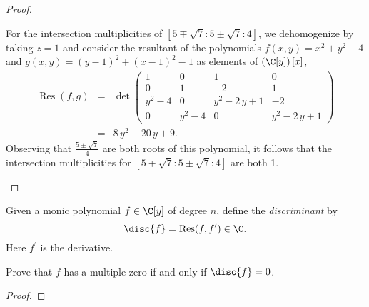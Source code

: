 \documentclass[10pt]{amsart}
\begin{document}
\begin{thm}
\begin{proof}
\begin{enumerate}[(a)]
      For the intersection multiplicities of $[5 \mp \sqrt{7} : 5 \pm \sqrt{7} : 4]$, we dehomogenize by taking $z = 1$ and consider the resultant of the polynomials $f(x,y) = x^{2} + y^{2} - 4$ and $g(x,y) = {\left(y - 1\right)}^{2} + {\left(x - 1\right)}^{2} - 1$ as elements of $\left(\C[y]\right)[x]$,
      \begin{eqnarray*}
        \operatorname{Res}(f,g) &=& \det\left(\begin{array}{cccc}
1 & 0 & 1 & 0 \\
0 & 1 & -2 & 1 \\
y^{2} - 4 & 0 & y^{2} - 2 \, y + 1 & -2 \\
0 & y^{2} - 4 & 0 & y^{2} - 2 \, y + 1
\end{array}\right) \\
        &=& 8 \, y^{2} - 20 \, y + 9.
      \end{eqnarray*}
      Observing that $\frac{5 \pm \sqrt{7}}{4}$ are both roots of this polynomial, it follows that the intersection multiplicities for $[5 \mp \sqrt{7} : 5 \pm \sqrt{7} : 4]$ are both 1.
    \end{enumerate}
  \end{proof}
\end{thm}

\begin{thm}
  Given a monic polynomial $f \in \C[y]$ of degree $n$, define the {\it discriminant} by
  $$\disc{f} = \operatorname{Res}(f, f^\prime) \in \C.$$
  Here $f^\prime$ is the derivative.
  
  Prove that $f$ has a multiple zero if and only if $\disc{f} = 0$.
  \begin{proof}
  \end{proof}
\end{thm}
\end{document}
